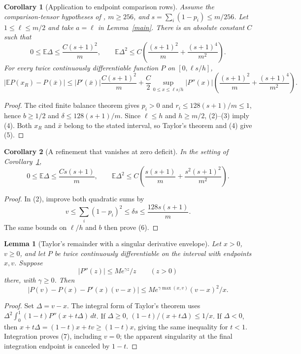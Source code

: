 \documentclass[11pt]{article}
\newtheorem{lemma}{Lemma}
\newtheorem{corollary}{Corollary}
\newcommand{\E}{\mathbb E}
\begin{document}
\begin{corollary}[Application to endpoint comparison rows]\label{apply}
Assume the comparison-tensor hypotheses of
, $m\ge256$, and
$s=\sum_i(1-p_i)\le m/256$. Let $1\le\ell\le m/2$ and take
$a=\ell$ in Lemma~\ref{main}. There is an absolute constant $C$ such
that
\[
 0\le\E\Delta\le\frac{C(s+1)^2}{m},\qquad
 \E\Delta^2\le C\left(\frac{(s+1)^2}{m}
                          +\frac{(s+1)^4}{m^2}\right).    \tag{4}
\]
For every twice continuously differentiable function $P$ on
$[0,\ell s/h]$,
\[
 \left|\E P(x_R)-P(\bar x)\right|
 \le |P'(\bar x)|\frac{C(s+1)^2}{m}
 +\frac C2\sup_{0\le x\le\ell s/h}|P''(x)|
       \left(\frac{(s+1)^2}{m}+\frac{(s+1)^4}{m^2}\right).
 \tag{5}
\]
\end{corollary}
\begin{proof}
The cited finite balance theorem gives $p_i>0$ and
$r_i\le128(s+1)/m\le1$, hence $b\ge1/2$ and
$\delta\le128(s+1)/m$. Since $\ell\le h$ and $h\ge m/2$,
(2)--(3) imply (4). Both $x_R$ and $\bar x$ belong to the stated
interval, so Taylor's theorem and (4) give (5).
\end{proof}


\begin{corollary}[A refinement that vanishes at zero deficit]\label{refined}
In the setting of Corollary~\ref{apply},
\[
 0\le\E\Delta\le\frac{Cs(s+1)}m,\qquad
 \E\Delta^2\le C\left(\frac{s(s+1)}m
                         +\frac{s^2(s+1)^2}{m^2}\right). \tag{6}
\]
\end{corollary}
\begin{proof}
In (2), improve both quadratic sums by
\[
 v\le\sum_i(1-p_i)^2\le\delta s
                \le\frac{128s(s+1)}m.
\]
The same bounds on $\ell/h$ and $b$ then prove (6).
\end{proof}

\begin{lemma}[Taylor's remainder with a singular derivative envelope]\label{singular}
Let $x>0$, $v\ge0$, and let $P$ be twice continuously differentiable
on the interval with endpoints $x,v$. Suppose
\[
 |P''(z)|\le M e^{\gamma z}/z\qquad(z>0)
\]
there, with $\gamma\ge0$. Then
\[
 |P(v)-P(x)-P'(x)(v-x)|
       \le M e^{\gamma\max(x,v)}(v-x)^2/x.         \tag{7}
\]
\end{lemma}
\begin{proof}
Set $\Delta=v-x$. The integral form of Taylor's theorem uses
$\Delta^2\int_0^1(1-t)P''(x+t\Delta)\,dt$. If $\Delta\ge0$,
$(1-t)/(x+t\Delta)\le1/x$. If $\Delta<0$, then
$x+t\Delta=(1-t)x+tv\ge(1-t)x$, giving the same inequality for
$t<1$. Integration proves (7), including $v=0$; the apparent
singularity at the final integration endpoint is canceled by $1-t$.
\end{proof}
\end{document}
